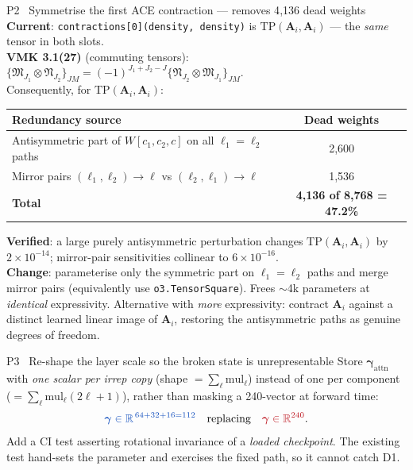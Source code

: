 \documentclass[10pt,a4paper]{article}
\newcommand{\BAD}[1]{\textcolor{BADred}{#1}}
\newcommand{\NEW}[1]{\textcolor{NEWblue}{#1}}
\newcommand{\Ai}{\bm{A}_i}
\newcommand{\code}[1]{\texttt{\small #1}}
\begin{document}
\begin{planbox}{P2 \ Symmetrise the first ACE contraction --- removes 4{,}136 dead weights}
\footnotesize\textbf{Current}: \code{contractions[0](density, density)} is
$\mathrm{TP}(\Ai,\Ai)$ --- the \emph{same} tensor in both slots.\\[3pt]
\textbf{VMK 3.1(27)} (commuting tensors):
$\{\bm{\mathfrak M}_{J_1}\otimes\bm{\mathfrak N}_{J_2}\}_{JM}
= (-1)^{J_1+J_2-J}\{\bm{\mathfrak N}_{J_2}\otimes\bm{\mathfrak M}_{J_1}\}_{JM}$.\\[3pt]
Consequently, for $\mathrm{TP}(\Ai,\Ai)$:
\begin{center}\footnotesize
\begin{tabular}{@{}lc@{}}
\toprule
Redundancy source & Dead weights\\
\midrule
Antisymmetric part of $W[c_1,c_2,c]$ on all $\ell_1=\ell_2$ paths & 2{,}600\\
Mirror pairs $(\ell_1,\ell_2)\!\to\!\ell$ vs $(\ell_2,\ell_1)\!\to\!\ell$ & 1{,}536\\
\midrule
\textbf{Total} & \textbf{4{,}136 of 8{,}768 = \NEW{47.2\%}}\\
\bottomrule
\end{tabular}
\end{center}
\vspace{2pt}
\textbf{Verified}: a large purely antisymmetric perturbation changes
$\mathrm{TP}(\Ai,\Ai)$ by $2\times10^{-14}$; mirror-pair sensitivities collinear to $6\times10^{-16}$.\\[3pt]
\NEW{\textbf{Change}}: parameterise only the symmetric part on $\ell_1=\ell_2$ paths and merge
mirror pairs (equivalently use \code{o3.TensorSquare}). Frees $\sim$4k parameters at
\emph{identical} expressivity. Alternative with \emph{more} expressivity: contract $\Ai$
against a distinct learned linear image of $\Ai$, restoring the antisymmetric paths as
genuine degrees of freedom.
\end{planbox}

\begin{planbox}{P3 \ Re-shape the layer scale so the broken state is unrepresentable}
\footnotesize Store $\bm\gamma_{\mathrm{attn}}$ with \emph{one scalar per irrep copy}
(shape $=\sum_\ell \mathrm{mul}_\ell$) instead of one per component
($=\sum_\ell \mathrm{mul}_\ell(2\ell+1)$), rather than masking a 240-vector at forward time:
\[
\NEW{\bm\gamma \in \mathbb R^{\,64+32+16=112}} \quad\text{replacing}\quad \BAD{\bm\gamma\in\mathbb R^{240}} .
\]
Add a CI test asserting rotational invariance of a \emph{loaded checkpoint}. The existing
test hand-sets the parameter and exercises the fixed path, so it cannot catch D1.
\end{planbox}
\end{document}
